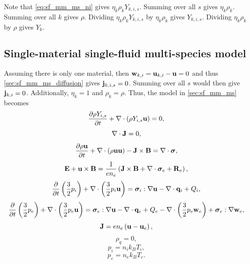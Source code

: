 \documentclass[a4paper,11pt]{report}
\begin{document}
Note that \cref{eq:sf_mm_ms_ni} gives $\eta_k \rho_k Y_{k,i,s}$. Summing over all $s$ gives $\eta_k \rho_k$. Summing over all $k$ gives $\rho$. Dividing $\eta_k \rho_k Y_{k,i,s}$ by $\eta_k \rho_k$ gives $Y_{k,i,s}$. Dividing $\eta_k \rho_k$ by $\rho$ gives $Y_k$.

\subsection{Single-material single-fluid multi-species model}
\label{sec:sf_sm_ms}

Assuming there is only one material, then $\mathbf{w}_{k,i} = \mathbf{u}_{k,i} - \mathbf{u} = 0$ and thus \cref{sec:sf_mm_ms_diffusion} gives $\mathbf{j}_{k,i,s} = 0$.  Summing over all $s$ would then give $\mathbf{j}_{k,i} = 0$. Additionally, $\eta_k=1$ and $\rho_k = \rho$. Thus, the model in \cref{sec:sf_mm_ms} becomes
\begin{equation}
    \label{eq:sf_sm_ms_ni}
    \frac{\partial \rho Y_{i,s}}{\partial t} + \nabla \cdot \left( \rho Y_{i,s} \mathbf{u} \right) = 0,
\end{equation}
\begin{equation}
    \label{eq:sf_sm_ms_ne}
    \nabla \cdot \mathbf{J} = 0,
\end{equation}
\begin{equation}
    \label{eq:sf_sm_ms_ui}
    \frac{\partial \rho \mathbf{u}}{\partial t} + \nabla \cdot \left( \rho \mathbf{u} \mathbf{u} \right) - \mathbf{J} \times \mathbf{B} = \nabla \cdot \bm \sigma,
\end{equation}
\begin{equation}
    \label{eq:sf_sm_ms_ue}
    \mathbf{E} + \mathbf{u} \times \mathbf{B} = \frac{1}{e n_e} \left( \mathbf{J} \times \mathbf{B} + \nabla \cdot \bm \sigma_e + \mathbf{R}_e \right),
\end{equation}
\begin{equation}
    \label{eq:sf_sm_ms_iei}
    \frac{\partial}{\partial t} \left( \frac{3}{2} p_i \right) + \nabla \cdot \left( \frac{3}{2} p_i \mathbf{u} \right) = \bm \sigma_i : \nabla \mathbf{u} - \nabla \cdot \mathbf{q}_i + Q_i,
\end{equation}
\begin{equation}
    \label{eq:sf_sm_ms_iee}
    \frac{\partial}{\partial t} \left( \frac{3}{2} p_e \right) + \nabla \cdot \left( \frac{3}{2} p_e \mathbf{u} \right) = \bm \sigma_e : \nabla \mathbf{u} - \nabla \cdot \mathbf{q}_e + Q_e - \nabla \cdot \left( \frac{3}{2} p_e \mathbf{w}_e \right) + \bm \sigma_e : \nabla \mathbf{w}_e,
\end{equation}
\begin{equation}
    \label{eq:sf_sm_ms_curr_density}
    \mathbf{J} = e n_e \left( \mathbf{u} - \mathbf{u}_e \right),
\end{equation}
\begin{equation}
    \label{eq:sf_sm_ms_mass_density}
    \rho_q = 0,
\end{equation}
\begin{equation}
    \label{eq:sf_sm_ms_eos_ion}
    p_i = n_i k_B T_i,
\end{equation}
\begin{equation}
    \label{eq:sf_sm_ms_eos_elec}
    p_e = n_e k_B T_e.
\end{equation}
\end{document}
